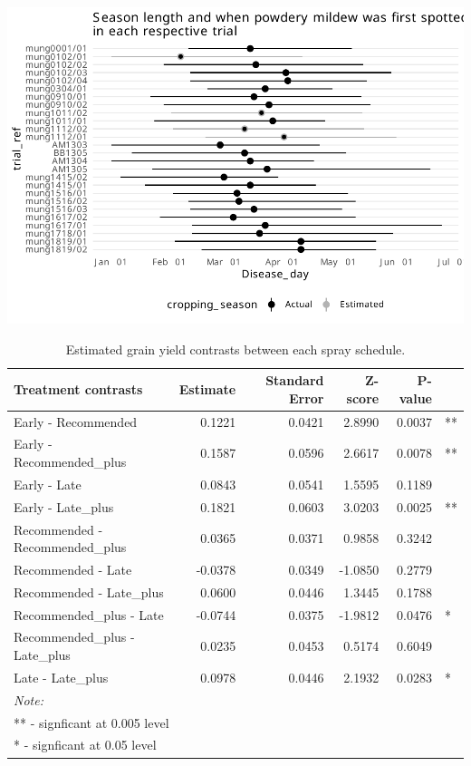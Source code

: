 \documentclass[agronomy,article,submit,moreauthors,pdftex]{mdpi}
\begin{document}
\includegraphics{paper_files/figure-latex/Figure2-1.pdf}

\begin{table}

\caption{\label{tab:Table3}Estimated grain yield contrasts between each spray schedule.}
\centering
\begin{tabular}[t]{lrrrrl}
\toprule
Treatment contrasts & Estimate & Standard Error & Z-score & P-value &  \\
\midrule
Early - Recommended & 0.1221 & 0.0421 & 2.8990 & 0.0037 & **\\
Early - Recommended\_plus & 0.1587 & 0.0596 & 2.6617 & 0.0078 & **\\
Early - Late & 0.0843 & 0.0541 & 1.5595 & 0.1189 & \\
Early - Late\_plus & 0.1821 & 0.0603 & 3.0203 & 0.0025 & **\\
Recommended - Recommended\_plus & 0.0365 & 0.0371 & 0.9858 & 0.3242 & \\
\addlinespace
Recommended - Late & -0.0378 & 0.0349 & -1.0850 & 0.2779 & \\
Recommended - Late\_plus & 0.0600 & 0.0446 & 1.3445 & 0.1788 & \\
Recommended\_plus - Late & -0.0744 & 0.0375 & -1.9812 & 0.0476 & *\\
Recommended\_plus - Late\_plus & 0.0235 & 0.0453 & 0.5174 & 0.6049 & \\
Late - Late\_plus & 0.0978 & 0.0446 & 2.1932 & 0.0283 & *\\
\bottomrule
\multicolumn{6}{l}{\textit{Note: }}\\
\multicolumn{6}{l}{** - signficant at 0.005 level}\\
\multicolumn{6}{l}{* - signficant at 0.05 level}\\
\end{tabular}
\end{table}
\end{document}
